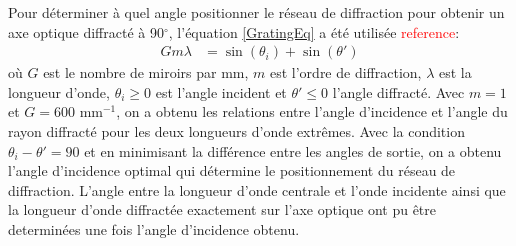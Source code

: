 \documentclass[conference]{IEEEtran}
\begin{document}
Pour déterminer à quel angle positionner le réseau de diffraction pour 
obtenir un axe optique diffracté à 90$^{\circ}$, l'équation \ref{GratingEq} a été utilisée \textcolor{red}{reference}:
\begin{align}\label{GratingEq}
    G m \lambda &= \sin(\theta_i) + \sin(\theta')
\end{align}
où $G$ est le nombre de miroirs par mm, $m$ est l'ordre de diffraction, $\lambda$ est la longueur d'onde,
$\theta_i \ge 0$ est l'angle incident et $\theta' \le 0$ l'angle diffracté. Avec $m=1$ et $G=600\text{ mm}^{-1}$,
on a obtenu les relations entre l'angle d'incidence et l'angle du rayon diffracté pour les deux longueurs 
d'onde extrêmes. Avec la condition $\theta_i-\theta'=90$ et en minimisant la différence entre les angles 
de sortie, on a obtenu l'angle d'incidence optimal qui détermine le positionnement du réseau de diffraction.
L'angle entre la longueur d'onde centrale et l'onde incidente ainsi que la longueur d'onde diffractée 
exactement sur l'axe optique ont pu être determinées une fois l'angle d'incidence obtenu.
\end{document}
